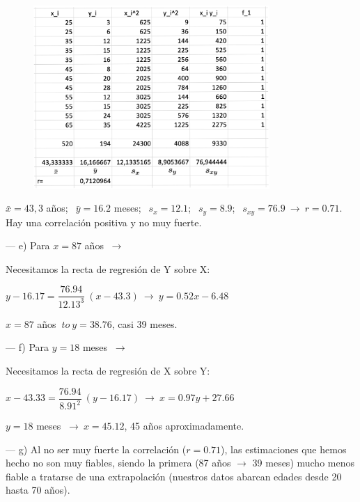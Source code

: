 	\begin{figure}[H]
			\centering
			\includegraphics[width=0.8\textwidth]{imagenes/imagenes03/T03IM18.png}
	\end{figure}
	
$\bar x=43,3$ años; $\ \ \bar y=16.2$ meses; $\ \ s_x=12.1$; $\ \ s_y=8.9$; $\ \ s_{xy}=76.9 \ \to \ r=0.71$. Hay una correlación positiva y no muy fuerte.

--- e) Para $x=87$ años $\ \to \ $ 

Necesitamos la recta de regresión de Y sobre X: 

$y-16.17=\dfrac{76.94}{12.13^3}\ (x-43.3) \ \to \ y= 0.52x-6.48$

$x=87$ años $\ to \ y=38.76$, casi 39 meses.

--- f) Para $y=18$ meses $\ \to \ $


Necesitamos la recta de regresión de X sobre Y:

$x-43.33=\dfrac{76.94}{8.91^2}\ (y-16.17) \ \to \ x=0.97y+27.66$

$y=18$ meses $\ \to \ x=45.12$, 45 años aproximadamente.

--- g) Al no ser muy fuerte la correlación ($r=0.71$), las estimaciones que hemos hecho no son  muy fiables, siendo la primera (87 años $\to$ 39 meses) mucho menos fiable a tratarse de una extrapolación (nuestros datos abarcan edades desde 20 hasta 70 años).




